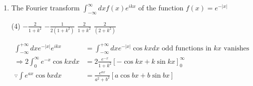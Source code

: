 \begin{enumerate}
\begin{figure}[H]
\end{figure}
\begin{tasks}(4)
	\task[\textbf{A.}] $\frac{1+e^{-s}}{s}$
	\task[\textbf{B.}] $\frac{1-e^{-s}}{s}$
	\task[\textbf{C.}] $\frac{1}{s\left(1+e^{-s}\right)}$
	\task[\textbf{D.}]  $\frac{1}{s\left(1-e^{-s}\right)}$
\end{tasks}
\begin{answer}
	$$
	\begin{aligned}
	L(f(x))&=\int_{0}^{\infty} e^{-s x} f(x) d x\\&=\int_{0}^{1} e^{-s x} \cdot 1 d x+\int_{1}^{2} e^{-s x} \cdot 0 d x+\int_{2}^{3} e^{-s x} \cdot 1 d x+\ldots \ldots\\
	&=\left[\frac{e^{-s x}}{-s}\right]_{0}^{1}+0+\left[\frac{e^{-s x}}{-s}\right]_{2}^{3}+\ldots \ldots\\&=\frac{1}{-s}\left[e^{-s}-1\right]+\frac{1}{-s}\left[e^{-3 s}-e^{-2 s}\right]+\ldots \ldots\\
	&=\frac{1}{-s}\left[-1+e^{-s}-e^{-2 s}+e^{-3 s}+\ldots \ldots . .\right]\\&=\frac{1}{s}\left[1-e^{-s}+e^{-2 s}-e^{-3 s}+\ldots .\right]\\
	\text{Since }S_{\infty}&=\frac{a}{1-r}\text{ where }r=-e^{-s}\text{ and }a\\&=1 \Rightarrow S_{\infty}=\frac{1}{s}\left[\frac{1}{\left(1+e^{-s}\right)}\right]
	\end{aligned}
	$$
		So the correct answer is \textbf{Option (c)}
\end{answer}
\item The Fourier transform $\int_{-\infty}^{\infty} d x f(x) e^{i k x}$ of the function $f(x)=e^{-|x|}$
\begin{tasks}(4)
	\task[\textbf{A.}] $-\frac{2}{1+k^{2}}$
	\task[\textbf{B.}] $-\frac{1}{2\left(1+k^{2}\right)}$
	\task[\textbf{C.}] $\frac{2}{1+k^{2}}$
	\task[\textbf{D.}] $\frac{2}{\left(2+k^{2}\right)}$
\end{tasks}
\begin{answer}
	$$
	\begin{aligned}
\int_{-\infty}^{+\infty} d x e^{-|x|} e^{i k x}&=\int_{-\infty}^{+\infty} d x e^{-|x|} \cos k x d x\text{ odd functions in }k x\text{ vanishes}\\
\Rightarrow 2 \int_{0}^{\infty} e^{-x} \cos k x d x&=2 \frac{e^{-x}}{1+k^{2}}[-\cos k x+k \sin k x]_{0}^{\infty}\\
\because \int e^{a x} \cos b x d x&=\frac{e^{a x}}{a^{2}+b^{2}}[a \cos b x+b \sin b x]\\

\end{aligned}$$
\end{answer}
\end{enumerate}
